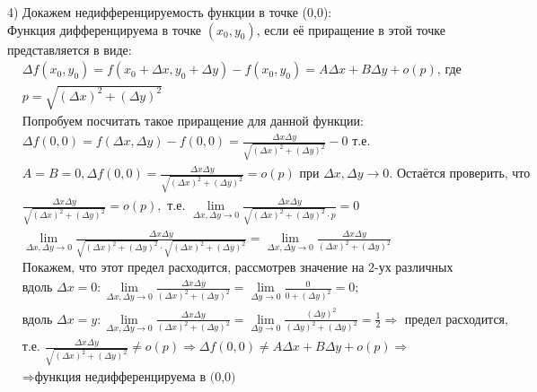 \documentclass[a4paper, 12pt]{article}
\begin{document}
4) Докажем недифференцируемость функции в точке (0,0): \\
Функция дифференцируема в точке $(x_0,y_0)$, если её приращение в этой точке представляется в виде:
\begin{align*}
&\Delta f(x_0,y_0) = f(x_0+\Delta x,y_0+\Delta y) - f(x_0,y_0) = 
A\Delta x + B\Delta y +o(p) \text{, где } \\
&p = \sqrt{(\Delta x)^2 + (\Delta y)^2} \\
&\text{Попробуем посчитать такое приращение для данной функции:} \\
&\Delta f(0,0) = f(\Delta x, \Delta y) - f(0,0) = 
\frac{\Delta x \Delta y}{\sqrt{(\Delta x)^2 + (\Delta y)^2}} - 0 \text{ т.е.} \\
&A = B = 0, \Delta f(0,0) = \frac{\Delta x \Delta y}{\sqrt{(\Delta x)^2 + (\Delta y)^2}} = o(p) \text{ при } \Delta x, \Delta y \to 0. \text{ Остаётся проверить, что } \\
&\frac{\Delta x \Delta y}{\sqrt{(\Delta x)^2 + (\Delta y)^2}} = o(p),\text{ т.е. }
\lim_{\Delta x, \Delta y \to 0}\frac{\Delta x \Delta y}{\sqrt{(\Delta x)^2 + (\Delta y)^2}\cdot p} = 0\\
&\lim_{\Delta x, \Delta y \to 0}\frac{\Delta x \Delta y}{\sqrt{(\Delta x)^2 + (\Delta y)^2}\cdot\sqrt{(\Delta x)^2 + (\Delta y)^2}} = 
\lim_{\Delta x, \Delta y \to 0}\frac{\Delta x \Delta y}{(\Delta x)^2 + (\Delta y)^2} \\
&\text{Покажем, что этот предел расходится, рассмотрев значение на 2-ух различных путях:} \\
&\text{вдоль }\Delta x=0: 
\lim_{\Delta x, \Delta y \to 0}\frac{\Delta x \Delta y}{(\Delta x)^2 + (\Delta y)^2} = 
\lim_{\Delta y \to 0}\frac{0}{0+(\Delta y)^2} = 0; \\
&\text{вдоль }\Delta x=y:
\lim_{\Delta x, \Delta y \to 0}\frac{\Delta x \Delta y}{(\Delta x)^2 + (\Delta y)^2} = 
\lim_{\Delta y \to 0}\frac{(\Delta y)^2}{(\Delta y)^2+(\Delta y)^2} = \frac{1}{2} \Rightarrow \text{ предел расходится,} \\
&\text{т.е. } \frac{\Delta x \Delta y}{\sqrt{(\Delta x)^2 + (\Delta y)^2}} \neq o(p) \Rightarrow \Delta f(0,0) \neq
A\Delta x + B\Delta y +o(p) \Rightarrow \\
&\Rightarrow \text{функция недифференцируема в (0,0)}
\end{align*}
\end{document}
